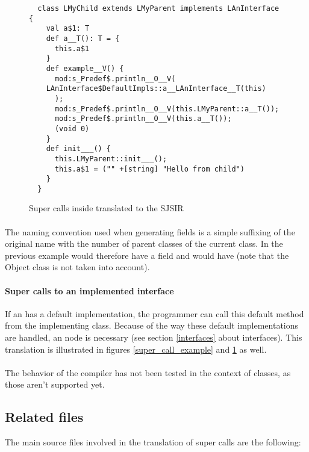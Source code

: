 \begin{figure}[h]
 \begin{verbatim}
  class LMyChild extends LMyParent implements LAnInterface {
    val a$1: T
    def a__T(): T = {
      this.a$1
    }
    def example__V() {
      mod:s_Predef$.println__O__V(
	LAnInterface$DefaultImpls::a__LAnInterface__T(this)
      );
      mod:s_Predef$.println__O__V(this.LMyParent::a__T());
      mod:s_Predef$.println__O__V(this.a__T());
      (void 0)
    }
    def init___() {
      this.LMyParent::init___();
      this.a$1 = ("" +[string] "Hello from child")
    }
  }
 \end{verbatim}
 \caption{Super calls inside  translated to the SJSIR }
 \label{super_call_ir}
\end{figure}


\paragraph{} The naming convention used when generating fields is a simple suffixing of the original name with the 
number of parent classes of the current class. In the previous example  would 
therefore have a field  and  would have  (note 
that the Object class is not taken into account).

\paragraph{Super calls to an implemented interface} If an  has a default 
implementation, the programmer can call this default method from the implementing class. Because of 
the way these default implementations are handled, an  node is necessary 
(see section \ref{interfaces} about interfaces). This translation is illustrated in figures 
\ref{super_call_example} and \ref{super_call_ir} as well.

\paragraph{} The behavior of the compiler has not been tested in the context of  
classes, as those aren't supported yet.


\subsection{Related files} The main source files involved in the translation of super calls are 
the following:

